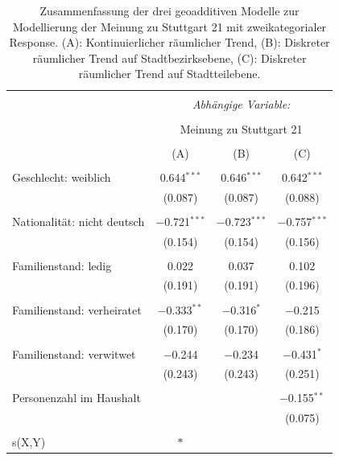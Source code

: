 \documentclass{Vorlage}
\begin{document}
\begin{appendix}
\begin{table}[!htbp] \centering 
  \caption{Zusammenfassung der drei geoadditiven Modelle zur Modellierung der Meinung zu Stuttgart 21 mit zweikategorialer Response. (A): Kontinuierlicher räumlicher Trend, (B): Diskreter räumlicher Trend auf Stadtbezirksebene, (C): Diskreter räumlicher Trend auf Stadtteilebene.} 
  \label{ParameterTabS212spat} 
\begin{tabular}{@{\extracolsep{5pt}}lccc} 
\\[-1.8ex]\hline 
\hline \\[-1.8ex] 
 & \multicolumn{3}{c}{\textit{Abhängige Variable:}} \\ 
\cline{2-4} 
\\[-1.8ex] & \multicolumn{3}{c}{Meinung zu Stuttgart 21} \\ 
\\[-1.8ex] & (A) & (B) & (C)\\ 
\hline \\[-1.8ex] 
 Geschlecht: weiblich & 0.644$^{***}$ & 0.646$^{***}$ & 0.642$^{***}$ \\ 
  & (0.087) & (0.087) & (0.088) \\ 
  & & & \\ 
 Nationalität: nicht deutsch & $-$0.721$^{***}$ & $-$0.723$^{***}$ & $-$0.757$^{***}$ \\ 
  & (0.154) & (0.154) & (0.156) \\ 
  & & & \\ 
 Familienstand: ledig & 0.022 & 0.037 & 0.102 \\ 
  & (0.191) & (0.191) & (0.196) \\ 
  & & & \\ 
 Familienstand: verheiratet & $-$0.333$^{**}$ & $-$0.316$^{*}$ & $-$0.215 \\ 
  & (0.170) & (0.170) & (0.186) \\ 
  & & & \\ 
 Familienstand: verwitwet & $-$0.244 & $-$0.234 & $-$0.431$^{*}$ \\ 
  & (0.243) & (0.243) & (0.251) \\ 
  & & & \\ 
   Personenzahl im Haushalt &  &  & $-$0.155$^{**}$ \\ 
  &  &  & (0.075) \\ 
    & & & \\ \hline
 s(X,Y) & $*$ &  &  \\ 

\end{tabular}
\end{table}
\end{appendix}
\end{document}

